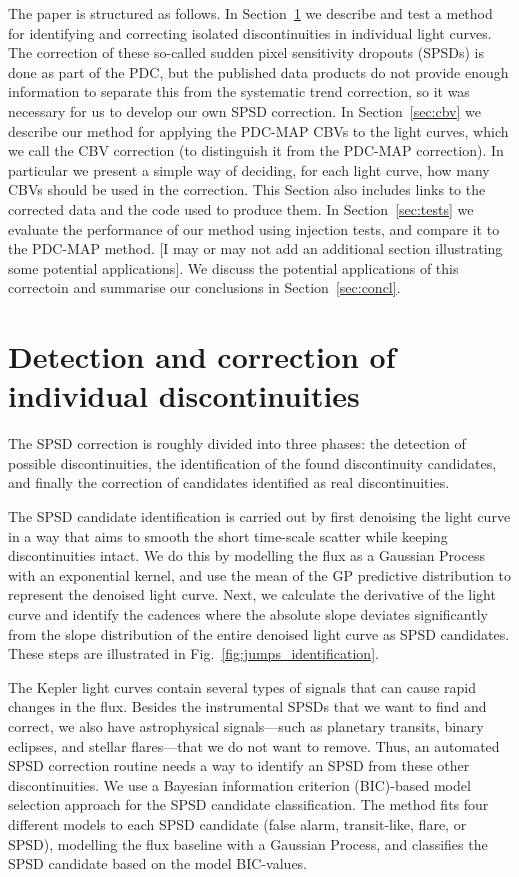 \documentclass[useAMS,usenatbib]{mn2e}
\begin{document}
The paper is structured as follows. In Section~\ref{sec:jumps} we
describe and test a method for identifying and correcting isolated
discontinuities in individual light curves. The correction of these
so-called sudden pixel sensitivity dropouts (SPSDs) is done as part of
the PDC, but the published data products do not provide enough
information to separate this from the systematic trend correction, so
it was necessary for us to develop our own SPSD correction. In
Section~\ref{sec:cbv} we describe our method for applying the PDC-MAP
CBVs to the light curves, which we call the CBV correction (to
distinguish it from the PDC-MAP correction). In particular we present a simple way of
deciding, for each light curve, how many CBVs should be used in the
correction. This Section also includes links to the corrected data and
the code used to produce them. In Section~\ref{sec:tests} we evaluate the performance of
our method using injection tests, and compare it to the PDC-MAP
method. [I may or may not add an additional section illustrating some
potential applications]. We discuss the potential applications of this
correctoin and summarise our conclusions in Section~\ref{sec:concl}.

\section{Detection and correction of individual discontinuities}
\label{sec:jumps}

The SPSD correction is roughly divided into three phases: the detection
of possible discontinuities, the identification of the found discontinuity 
candidates, and finally the correction of candidates identified as real
discontinuities.


The SPSD candidate identification is carried out by first denoising the 
light curve in a way that aims to smooth the short time-scale scatter
while keeping discontinuities intact. We do this by modelling the flux 
as a Gaussian Process with an exponential kernel, and use the mean of the GP 
predictive distribution to represent the denoised light curve. Next, we
calculate the derivative of the light curve and identify the cadences where the
absolute slope deviates significantly from the slope distribution of the entire
denoised light curve as SPSD candidates. These steps are illustrated in 
Fig.~\ref{fig:jumps_identification}.


The Kepler light curves contain several types of signals that can cause rapid
changes in the flux. Besides the instrumental SPSDs that we want to find and correct, 
we also have astrophysical signals---such as planetary transits, binary eclipses, and stellar 
flares---that we do not want to remove. Thus, an automated SPSD correction routine
needs a way to identify an SPSD from these other discontinuities. We use a 
Bayesian information criterion (BIC)-based model selection approach for the
SPSD candidate classification. The method fits four different models to each SPSD candidate
(false alarm, transit-like, flare, or SPSD), modelling the flux baseline with a
Gaussian Process, and classifies the SPSD candidate based on the model BIC-values.
\end{document}
